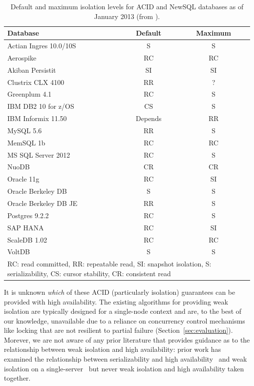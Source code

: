 \begin{table}
\begin{center}
\begin{small}
\begin{tabular}{|l|c|c|}
\hline
Database & Default & Maximum\\\hline
Actian Ingres 10.0/10S & S & S\\
Aerospike & RC & RC\\
Akiban Persistit & SI & SI\\
Clustrix CLX 4100 & RR & ?\\
Greenplum 4.1 & RC & S \\
IBM DB2 10 for z/OS & CS & S\\
IBM Informix 11.50 & Depends & RR\\
MySQL 5.6 & RR & S \\
MemSQL 1b & RC & RC\\
MS SQL Server 2012 & RC & S \\
NuoDB & CR & CR\\
Oracle 11g & RC & SI\\
Oracle Berkeley DB & S & S\\
Oracle Berkeley DB JE & RR & S\\
Postgres 9.2.2 & RC & S\\
SAP HANA & RC & SI\\
ScaleDB 1.02 & RC & RC\\
VoltDB & S & S\\
\hline
\multicolumn{3}{|p{7cm}|}{{\footnotesize RC: read committed, RR: repeatable read, SI: snapshot isolation, S: serializability, CS: cursor stability, CR: consistent read}}\\\hline

\end{tabular}
\caption{Default and maximum isolation levels for ACID and NewSQL
  databases as of January 2013 (from
  \protect\cite{hat-hotos}).}\vspace{-1.5em}
\label{table:existing}
\end{small}
\end{center}
\end{table}

It is unknown \textit{which} of these ACID (particularly isolation)
guarantees can be provided with high availability. The existing
algorithms for providing weak isolation are typically designed for a
single-node context and are, to the best of our knowledge, unavailable
due to a reliance on concurrency control mechanisms like locking that
are not resilient to partial failure
(Section~\ref{sec:evaluation}). Morever, we are not aware of any prior
literature that provides guidance as to the relationship between weak
isolation and high availability: prior work has examined the
relationship between serializability and high
availability~\cite{davidson-survey} and weak isolation on a
single-server~\cite{adya, ansicritique} but never weak isolation and
high availability taken together.
